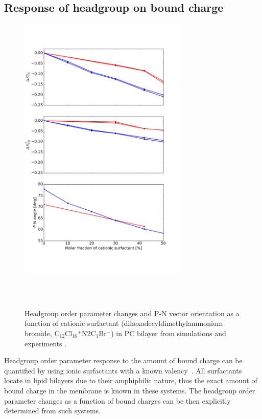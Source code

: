 \documentclass[aip,jcp,twocolumn]{revtex4}
\begin{document}
\subsection{Response of headgroup on bound charge}

\begin{figure}[tbp]
  \centering
  \includegraphics[width=8.0cm]{../Fig/ipython_nb/PN_angle_OrdPars-A-B_L14-ECCL17_q80_sig89_surf.png}
  \caption{\label{OrderParameterCHANGESsurf}
    Headgroup order parameter changes and P-N vector orientation as a function of
    cationic surfactant (dihexadecyldimethylammonium bromide, C$_{12}$Cl$_{16}$$^+$N2C$_1$Br$^-$)
    in PC bilayer from simulations and experiments \cite{scherer89}.
  }
   \\
  \\
\end{figure}

Headgroup order parameter response to the amount of bound charge can
be quantified by using ionic surfactants with a known valency~\cite{scherer89}.
All surfactants locate in lipid bilayers due to their amphiphilic nature,
thus the exact amount of bound charge in the membrane is known in these systems.
The headgroup order parameter changes as a function of bound charges can be then
explicitly determined from such systems.
\end{document}
